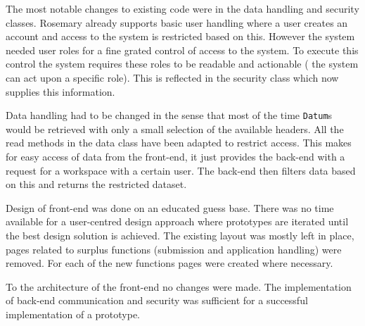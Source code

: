 The most notable changes to existing code were in the data handling and security classes.
Rosemary already supports basic user handling where a user creates an account and access to the system is restricted based on this.
However the system needed user roles for a fine grated control of access to the system.
To execute this control the system requires these roles to be readable and actionable (\ie{} the system can act upon a specific role).
This is reflected in the security class which now supplies this information.

Data handling had to be changed in the sense that most of the time {\tt Datum}s would be retrieved with only a small selection of the available headers.
All the read methods in the data class have been adapted to restrict access.
This makes for easy access of data from the front-end, it just provides the back-end with a request for a workspace with a certain user.
The back-end then filters data based on this and returns the restricted dataset.

Design of front-end was done on an educated guess base.
There was no time available for a user-centred design approach where prototypes are iterated until the best design solution is achieved.
The existing layout was mostly left in place, pages related to surplus functions (submission and application handling) were removed.
For each of the new functions pages were created where necessary.

To the architecture of the front-end no changes were made.
The implementation of back-end communication and security was sufficient for a successful implementation of a prototype.
